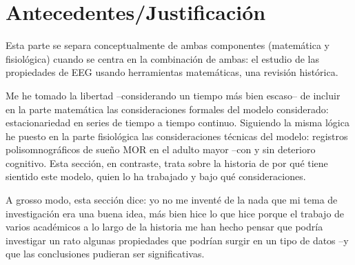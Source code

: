 
\chapter{Antecedentes/Justificaci\'on}

Esta parte se separa conceptualmente de ambas componentes (matem\'atica y fisiol\'ogica)
cuando se centra en la combinaci\'on de ambas: el estudio de las propiedades de EEG
usando herramientas matem\'aticas, una revisi\'on hist\'orica.

Me he tomado la libertad --considerando un tiempo m\'as bien escaso-- de incluir en la parte
matem\'atica las consideraciones formales del modelo considerado: estacionariedad en series
de tiempo a tiempo continuo. Siguiendo la misma l\'ogica he puesto en la parte fisiol\'ogica
las consideraciones t\'ecnicas del modelo: registros polisomnogr\'aficos de sue\~no MOR en
el adulto mayor --con y sin deterioro cognitivo. Esta secci\'on, en contraste, trata
sobre la historia de por qu\'e tiene sientido este modelo, quien lo ha trabajado y bajo qu\'e
consideraciones.

A grosso modo, esta secci\'on dice: yo no me invent\'e de la nada que mi tema de investigaci\'on
era una buena idea, 
m\'as bien hice lo que hice porque
el trabajo de varios acad\'emicos a lo largo de la historia me han hecho
pensar que podr\'ia investigar un rato algunas propiedades que podr\'ian surgir en un tipo de 
datos --y que las conclusiones pudieran ser significativas.

